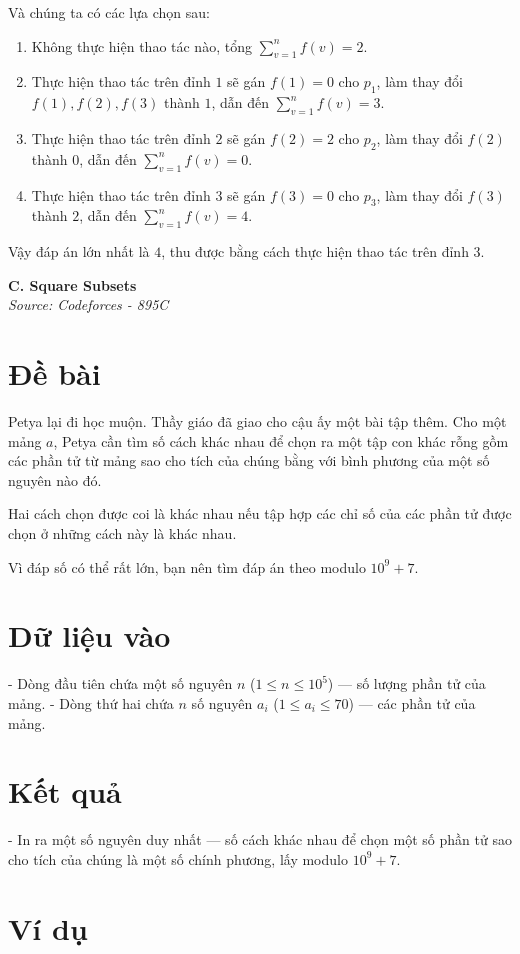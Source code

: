 \documentclass[11pt]{article}
\newcommand{\problem}[2]{
    \begin{problembox}
    \begin{center}
        \Large \textbf{#1} \\
        \vspace{0.2cm}
        \small \textit{Source: #2}
    \end{center}
    \end{problembox}
}
\begin{document}
Và chúng ta có các lựa chọn sau:
\begin{enumerate}
    \item Không thực hiện thao tác nào, tổng $\sum_{v = 1}^n f(v) = 2$.
    \item Thực hiện thao tác trên đỉnh $1$ sẽ gán $f(1) = 0$ cho $p_1$, làm thay đổi $f(1), f(2), f(3)$ thành $1$, dẫn đến $\sum_{v = 1}^n f(v) = 3$.
    \item Thực hiện thao tác trên đỉnh $2$ sẽ gán $f(2) = 2$ cho $p_2$, làm thay đổi $f(2)$ thành $0$, dẫn đến $\sum_{v = 1}^n f(v) = 0$.
    \item Thực hiện thao tác trên đỉnh $3$ sẽ gán $f(3) = 0$ cho $p_3$, làm thay đổi $f(3)$ thành $2$, dẫn đến $\sum_{v = 1}^n f(v) = 4$.
\end{enumerate}

Vậy đáp án lớn nhất là $4$, thu được bằng cách thực hiện thao tác trên đỉnh $3$.

\newpage
\problem{C. Square Subsets}{Codeforces - 895C}

\section*{Đề bài}
Petya lại đi học muộn. Thầy giáo đã giao cho cậu ấy một bài tập thêm. Cho một mảng $a$, Petya cần tìm số cách khác nhau để chọn ra một tập con khác rỗng gồm các phần tử từ mảng sao cho tích của chúng bằng với bình phương của một số nguyên nào đó.

Hai cách chọn được coi là khác nhau nếu tập hợp các chỉ số của các phần tử được chọn ở những cách này là khác nhau.

Vì đáp số có thể rất lớn, bạn nên tìm đáp án theo modulo $10^9+7$.

\section*{Dữ liệu vào}
- Dòng đầu tiên chứa một số nguyên $n$ ($1 \le n \le 10^5$) — số lượng phần tử của mảng.
- Dòng thứ hai chứa $n$ số nguyên $a_i$ ($1 \le a_i \le 70$) — các phần tử của mảng.

\section*{Kết quả}
- In ra một số nguyên duy nhất — số cách khác nhau để chọn một số phần tử sao cho tích của chúng là một số chính phương, lấy modulo $10^9+7$.

\section*{Ví dụ}
\end{document}
